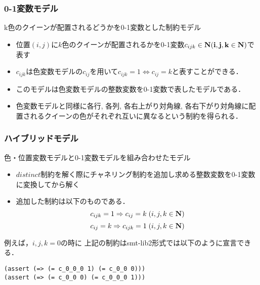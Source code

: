 \documentclass [dvipdfmx,11pt]{beamer}
\newcommand{\distinct}{$distinct$}
\begin{document}
\begin{frame}\small
    \frametitle{0-1変数モデル}
    \alert{k色のクイーンが配置されるどうか}を0-1変数とした制約モデル\\
    \setlength{\abovedisplayskip}{1pt} %
    \setlength{\belowdisplayskip}{1pt} %
    \begin{block}{}
        \begin{itemize}
            \item 位置$(i, j)$に$k$色のクイーンが配置されるかを0-1変数$c_{ijk} \in \bf N (i, j, k \in \bf N)$で表す
            \item $c_{ijk}$は色変数モデルの$c_{ij}$を用いて$c_{ijk}=1 \Leftrightarrow c_{ij}=k$と表すことができる．
            \item このモデルは色変数モデルの整数変数を0-1変数で表したモデルである．
            \item 色変数モデルと同様に\alert{各行}, \alert{各列}, \alert{各右上がり対角線}, \alert{各右下がり対角線}に配置されるクイーンの色がそれぞれ互いに異なるという制約を得られる．
        \end{itemize}
    \end{block}
\end{frame}


\begin{frame}[fragile]\small
    \frametitle{ハイブリッドモデル}
    色・位置変数モデルと0-1変数モデルを組み合わせたモデル\\
    \setlength{\abovedisplayskip}{1pt} %
    \setlength{\belowdisplayskip}{1pt} %
    \begin{block}{}
        \begin{itemize}
            \item \distinct 制約を解く際にチャネリング制約を追加し求める整数変数を0-1変数に変換してから解く
            \item 追加した制約は以下のものである．
                $$ c_{ijk}=1 \Rightarrow c_{ij}=k \; (i,j,k \in \bf N)$$
                $$ c_{ij}=k \Rightarrow c_{ijk}=1 \; (i,j,k \in \bf N)$$
        \end{itemize}
    \end{block}
    例えば，$i,j,k=0$の時に
    上記の制約はsmt-lib2形式では以下のように宣言できる．
    \begin{exampleblock}{}
\begin{verbatim}
(assert (=> (= c_0_0_0 1) (= c_0_0 0)))
(assert (=> (= c_0_0 0) (= c_0_0_0 1)))
\end{verbatim}
    \end{exampleblock}
\end{frame}
\end{document}
